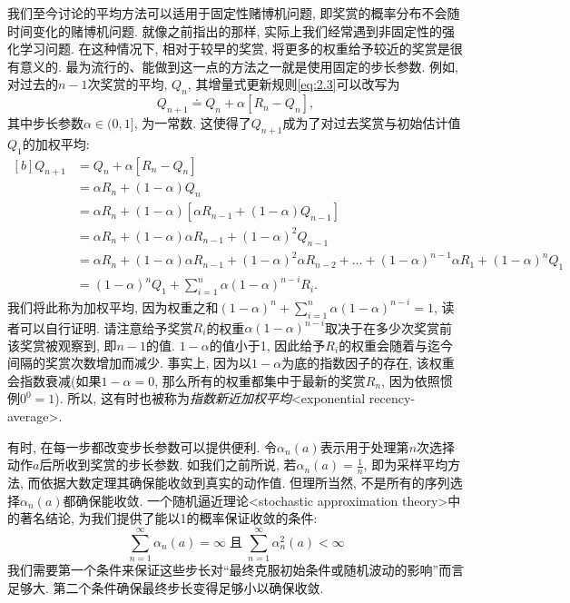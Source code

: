 我们至今讨论的平均方法可以适用于固定性赌博机问题, 即奖赏的概率分布不会随时间变化的赌博机问题. 就像之前指出的那样, 实际上我们经常遇到非固定性的强化学习问题. 在这种情况下, 相对于较早的奖赏, 将更多的权重给予较近的奖赏是很有意义的. 最为流行的、能做到这一点的方法之一就是使用固定的步长参数. 例如, 对过去的$n - 1$次奖赏的平均, $Q_n$, 其增量式更新规则\eqref{eq:2.3}可以改写为
\begin{equation}\label{eq:2.5}
Q_{n + 1} \doteq Q_n + \alpha [R_n - Q_n],
\end{equation}
其中步长参数$\alpha \in (0, 1]$, 为一常数. 这使得了$Q_{n + 1}$成为了对过去奖赏与初始估计值$Q_1$的加权平均:
\begin{equation}\label{eq:2.6}
\begin{aligned}[b]
Q_{n + 1} &= Q_n + \alpha [R_n - Q_n] \\
&= \alpha R_n + (1 - \alpha) Q_n \\
&=  \alpha R_n + (1 - \alpha) [\alpha R_{n - 1} + (1 - \alpha)Q_{n - 1}] \\
&=  \alpha R_n + (1 - \alpha) \alpha R_{n - 1} + (1 - \alpha)^2 Q_{n - 1} \\
&=  \alpha R_n + (1 - \alpha) \alpha R_{n - 1} + (1 - \alpha)^2 \alpha R_{n - 2} + \dots + (1 - \alpha)^{n - 1} \alpha R_1 + (1 - \alpha)^n Q_1 \\
&= (1 - \alpha)^n Q_1 + \sum_{i = 1}^n \alpha (1 - \alpha)^{n - i} R_i.
\end{aligned}
\end{equation}
我们将此称为加权平均, 因为权重之和$(1 - \alpha)^n + \sum_{i = 1}^n \alpha (1 - \alpha)^{n - i} = 1$, 读者可以自行证明. 请注意给予奖赏$R_i$的权重$\alpha (1 - \alpha)^{n - i}$取决于在多少次奖赏前该奖赏被观察到, 即$n - 1$的值. $1 - \alpha$的值小于1, 因此给予$R_i$的权重会随着与迄今间隔的奖赏次数增加而减少. 事实上, 因为以$1 - \alpha$为底的指数因子的存在, 该权重会指数衰减(如果$1 - \alpha = 0$, 那么所有的权重都集中于最新的奖赏$R_n$, 因为依照惯例$0^0 = 1$). 所以, 这有时也被称为\emph{指数新近加权平均}<exponential recency-average>.

有时, 在每一步都改变步长参数可以提供便利. 令$\alpha_n (a)$表示用于处理第$n$次选择动作$a$后所收到奖赏的步长参数. 如我们之前所说, 若$\alpha_n (a) = \frac{1}{n}$, 即为采样平均方法, 而依据大数定理其确保能收敛到真实的动作值. 但理所当然, 不是所有的序列选择${\alpha_n(a)}$都确保能收敛. 一个随机逼近理论<stochastic approximation theory>中的著名结论, 为我们提供了能以1的概率保证收敛的条件:
\begin{equation}\label{eq:2.7}
\sum_{n = 1}^\infty \alpha_n(a) = \infty  \; \text{且} \; \sum_{n = 1}^\infty \alpha_n^2(a) < \infty
\end{equation}
我们需要第一个条件来保证这些步长对``最终克服初始条件或随机波动的影响''而言足够大. 第二个条件确保最终步长变得足够小以确保收敛. 


